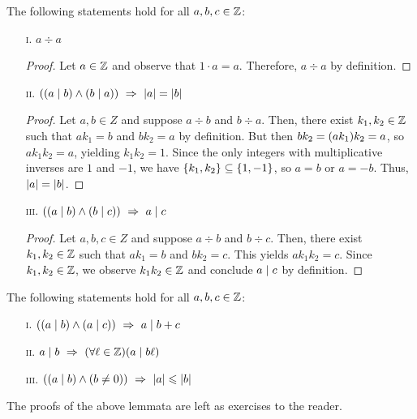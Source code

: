 \begin{lemma}\label{lem:divpartial}
    The following statements hold for all $a, b, c \in \mathbb{Z}$:
    \begin{enumerate}
        \item[\textsc{i}.]
            $a \div a$
            \begin{proof}
                Let $a \in \mathbb{Z}$ and observe that $1 \cdot a = a$.
                Therefore, $a \div a$ by definition.
            \end{proof}
        \item[\textsc{ii}.]
            $\pn*{\pn*{a \div b} \meet \pn*{b \div a}} \implies \abs{a} = \abs{b}$
            \begin{proof}
                Let $a, b \in Z$ and suppose $a \div b$ and $b \div a$.
                Then, there exist $k_1, k_2 \in \mathbb{Z}$ such that $ak_1 = b$ and $bk_2 = a$ by definition.
                But then $bk_2 = \pn*{ak_1}k_2 = a$, so $ak_1k_2 = a$, yielding $k_1k_2 = 1$.
                Since the only integers with multiplicative inverses are $1$ and $-1$,
                we have $\set*{k_1, k_2} \subseteq \set*{1, -1}$,
                so $a = b$ or $a = -b$.
                Thus, $\lvert a\rvert = \lvert b\rvert$.
            \end{proof}
        \item[\textsc{iii}.]
            $\pn*{\pn*{a \div b} \meet \pn*{b \div c}} \implies a \div c$
            \begin{proof}
                Let $a, b, c \in Z$ and suppose $a \div b$ and $b \div c$.
                Then, there exist $k_1, k_2 \in \mathbb{Z}$ such that $ak_1 = b$ and $bk_2 = c$.
                This yields $ak_1k_2 = c$.
                Since $k_1, k_2 \in \mathbb{Z}$,
                we observe $k_1k_2 \in \mathbb{Z}$ and conclude $a \mid c$ by definition.
            \end{proof}
    \end{enumerate}
    \vspace{-2ex}
\end{lemma}

\begin{lemma}\label{lem:divalgebra}
    The following statements hold for all $a, b, c \in \mathbb{Z}$:
    \begin{enumerate}
        \item[\textsc{i}.]
            $\pn*{\pn*{a \div b} \meet \pn*{a \div c}} \implies a \div b + c$
        \item[\textsc{ii}.]
            $a \div b \implies \pn*{\forall \ell \in \Z}\pn*{a \div b\ell}$
        \item[\textsc{iii}.]
            $\pn*{\pn*{a \div b} \meet \pn*{b \neq 0}} \implies \abs{a} \leq \abs{b}$
    \end{enumerate}
    The proofs of the above lemmata are left as exercises to the reader.
\end{lemma}

